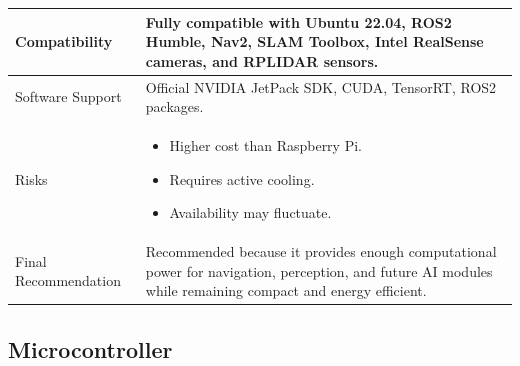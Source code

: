 \documentclass[12pt,a4paper]{article}
\begin{document}
\begin{longtable}{|p{4cm}|p{10cm}|}
Compatibility &
Fully compatible with Ubuntu 22.04, ROS2 Humble, Nav2, SLAM Toolbox, Intel RealSense cameras, and RPLIDAR sensors. \\
\hline

Software Support &
Official NVIDIA JetPack SDK, CUDA, TensorRT, ROS2 packages. \\
\hline

Risks &
\begin{itemize}
\item Higher cost than Raspberry Pi.
\item Requires active cooling.
\item Availability may fluctuate.
\end{itemize}
\\
\hline

Final Recommendation &
Recommended because it provides enough computational power for navigation, perception, and future AI modules while remaining compact and energy efficient. \\
\hline

\end{longtable}

\subsection{Microcontroller}
\end{document}
